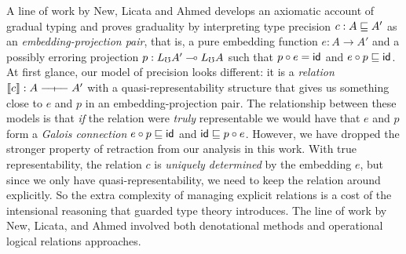 A line of work by New, Licata and Ahmed
\cite{new-ahmed2018,new-licata18,new-licata-ahmed2019} develops an axiomatic
account of gradual typing and proves graduality by interpreting type precision
$c : A \sqsubseteq A'$ as an \emph{embedding-projection pair}, that is, a pure
embedding function $e : A \to A'$ and a possibly erroring projection $p : L_\mho A'
\multimap L_\mho A$ such that $p \circ e = \mathsf{id}$ and $e \circ p \sqsubseteq \mathsf{id}$. At
first glance, our model of precision looks different: it is a \emph{relation}
$\sem{c} : A \rel A'$ with a quasi-representability structure that gives us
something close to $e$ and $p$ in an embedding-projection pair. The relationship
between these models is that \emph{if} the relation were \emph{truly}
representable we would have that $e$ and $p$ form a \emph{Galois connection} $e
\circ p \sqsubseteq \mathsf{id}$ and $\mathsf{id} \sqsubseteq p \circ e$. However, we have dropped the
stronger property of retraction from our analysis in this work. With true
representability, the relation $c$ is \emph{uniquely determined} by the
embedding $e$, but since we only have quasi-representability, we need to keep
the relation around explicitly. So the extra complexity of managing explicit
relations is a cost of the intensional reasoning that guarded type theory
introduces. 
%
The line of work by New, Licata, and Ahmed involved both denotational methods
and operational logical relations approaches.






